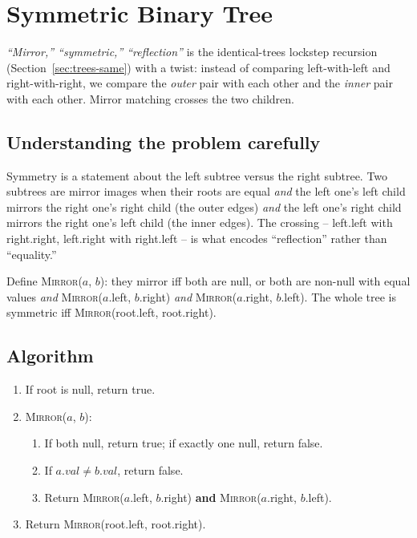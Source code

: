 \section{Symmetric Binary Tree}
\label{sec:trees-symmetric}


\begin{patternbox}
\emph{``Mirror,'' ``symmetric,'' ``reflection''} is the identical-trees
lockstep recursion (Section~\ref{sec:trees-same}) with a twist: instead of
comparing left-with-left and right-with-right, we compare the \emph{outer}
pair with each other and the \emph{inner} pair with each other. Mirror
matching crosses the two children.
\end{patternbox}

\subsection*{Understanding the problem carefully}

Symmetry is a statement about the left subtree versus the right subtree.
Two subtrees are mirror images when their roots are equal \emph{and} the
left one's left child mirrors the right one's right child (the outer edges)
\emph{and} the left one's right child mirrors the right one's left child
(the inner edges). The crossing -- left.left with right.right, left.right
with right.left -- is what encodes ``reflection'' rather than ``equality.''

\begin{ideabox}
Define \textsc{Mirror}($a$, $b$): they mirror iff both are null, or both
are non-null with equal values \emph{and} \textsc{Mirror}($a$.left,
$b$.right) \emph{and} \textsc{Mirror}($a$.right, $b$.left). The whole tree
is symmetric iff \textsc{Mirror}(root.left, root.right).
\end{ideabox}

\subsection*{Algorithm}

\begin{enumerate}
  \item If root is null, return true.
  \item \textsc{Mirror}($a$, $b$):
  \begin{enumerate}
    \item If both null, return true; if exactly one null, return false.
    \item If $a.val \ne b.val$, return false.
    \item Return \textsc{Mirror}($a$.left, $b$.right) \textbf{and}
          \textsc{Mirror}($a$.right, $b$.left).
  \end{enumerate}
  \item Return \textsc{Mirror}(root.left, root.right).
\end{enumerate}

